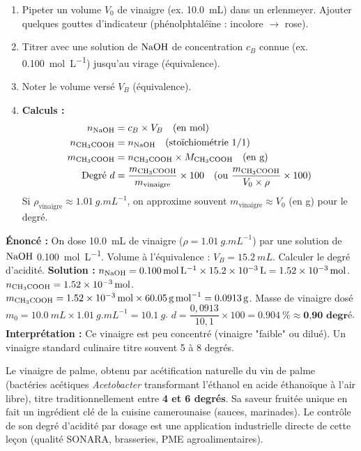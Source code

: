 \documentclass[11pt]{article}
\begin{document}
\begin{methode}
\begin{enumerate}
  \item Pipeter un volume $V_0$ de vinaigre (ex. \SI{10,0}{mL}) dans un erlenmeyer. Ajouter quelques gouttes d'indicateur (phénolphtaléïne : incolore $\to$ rose).
  \item Titrer avec une solution de $\ce{NaOH}$ de concentration $c_B$ connue (ex. \SI{0,100}{mol.L^{-1}}) jusqu'au virage (équivalence).
  \item Noter le volume versé $V_B$ (équivalence).
  \item \textbf{Calculs :}
  \begin{align*}
    n_{\ce{NaOH}} &= c_B \times V_B \quad (\text{en mol}) \\
    n_{\ce{CH3COOH}} &= n_{\ce{NaOH}} \quad (\text{stoïchiométrie 1/1}) \\
    m_{\ce{CH3COOH}} &= n_{\ce{CH3COOH}} \times M_{\ce{CH3COOH}} \quad (\text{en g}) \\
    \text{Degré } d &= \dfrac{m_{\ce{CH3COOH}}}{m_{\text{vinaigre}}} \times 100 \quad (\text{ou } \dfrac{m_{\ce{CH3COOH}}}{V_0 \times \rho} \times 100)
  \end{align*}
  Si $\rho_{\text{vinaigre}} \approx \SI{1,01}{g.mL^{-1}}$, on approxime souvent $m_{\text{vinaigre}} \approx V_0$ (en g) pour le degré.
\end{enumerate}
\end{methode}

\begin{exoresolu}
\textbf{Énoncé :} On dose \SI{10,0}{mL} de vinaigre ($\rho = \SI{1,01}{g.mL^{-1}}$) par une solution de $\ce{NaOH}$ \SI{0,100}{mol.L^{-1}}. Volume à l'équivalence : $V_B = \SI{15,2}{mL}$. Calculer le degré d'acidité.
\textbf{Solution :}
$n_{\ce{NaOH}} = \SI{0,100}{mol.L^{-1}} \times \SI{15,2e-3}{L} = \SI{1,52e-3}{mol}$.
$n_{\ce{CH3COOH}} = \SI{1,52e-3}{mol}$.
$m_{\ce{CH3COOH}} = \SI{1,52e-3}{mol} \times \SI{60,05}{g.mol^{-1}} = \SI{0,0913}{g}$.
Masse de vinaigre dosé $m_0 = \SI{10,0}{mL} \times \SI{1,01}{g.mL^{-1}} = \SI{10,1}{g}$.
$d = \dfrac{0,0913}{10,1} \times 100 = \SI{0,904}{\%} \approx \textbf{0,90 degré}$.
\tcblower
\textbf{Interprétation :} Ce vinaigre est peu concentré (vinaigre "faible" ou dilué). Un vinaigre standard culinaire titre souvent 5 à 8 degrés.
\end{exoresolu}

\begin{savaistu}
Le vinaigre de palme, obtenu par acétification naturelle du vin de palme (bactéries acétiques \emph{Acetobacter} transformant l'éthanol en acide éthanoïque à l'air libre), titre traditionnellement entre \textbf{4 et 6 degrés}. Sa saveur fruitée unique en fait un ingrédient clé de la cuisine camerounaise (sauces, marinades). Le contrôle de son degré d'acidité par dosage est une application industrielle directe de cette leçon (qualité SONARA, brasseries, PME agroalimentaires).
\end{savaistu}
\end{document}

